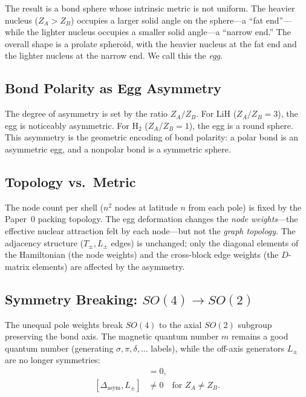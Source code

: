 \documentclass[aps,pra,twocolumn,superscriptaddress,longbibliography]{revtex4-2}
\begin{document}
The result is a bond sphere whose intrinsic metric is not uniform.
The heavier nucleus ($Z_A > Z_B$) occupies a larger solid angle on the
sphere---a ``fat end''---while the lighter nucleus occupies a smaller
solid angle---a ``narrow end.''  The overall shape is a prolate
spheroid, with the heavier nucleus at the fat end and the lighter
nucleus at the narrow end.  We call this the \emph{egg}.

\subsection{Bond Polarity as Egg Asymmetry}

The degree of asymmetry is set by the ratio $Z_A/Z_B$.  For LiH
($Z_A/Z_B = 3$), the egg is noticeably asymmetric.  For H$_2$
($Z_A/Z_B = 1$), the egg is a round sphere.  This asymmetry is
the geometric encoding of bond polarity: a polar bond is an
asymmetric egg, and a nonpolar bond is a symmetric sphere.

\subsection{Topology vs.\ Metric}

The node count per shell ($n^2$ nodes at latitude $n$ from each pole)
is fixed by the Paper~0 packing topology.  The egg deformation changes
the \emph{node weights}---the effective nuclear attraction felt by each
node---but not the \emph{graph topology}.  The adjacency structure
($T_\pm, L_\pm$ edges) is unchanged; only the diagonal elements of the
Hamiltonian (the node weights) and the cross-block edge weights (the
$D$-matrix elements) are affected by the asymmetry.

\subsection{Symmetry Breaking: $SO(4) \to SO(2)$}

The unequal pole weights break $SO(4)$ to the axial $SO(2)$ subgroup
preserving the bond axis.  The magnetic quantum number $m$ remains a
good quantum number (generating $\sigma, \pi, \delta, \ldots$ labels),
while the off-axis generators $L_\pm$ are no longer symmetries:
\begin{align}
[\Delta_{\text{asym}}, L_z] &= 0, \label{eq:Lz_comm} \\
[\Delta_{\text{asym}}, L_\pm] &\neq 0 \quad\text{for } Z_A \neq Z_B.
\label{eq:Lpm_comm}
\end{align}
\end{document}
